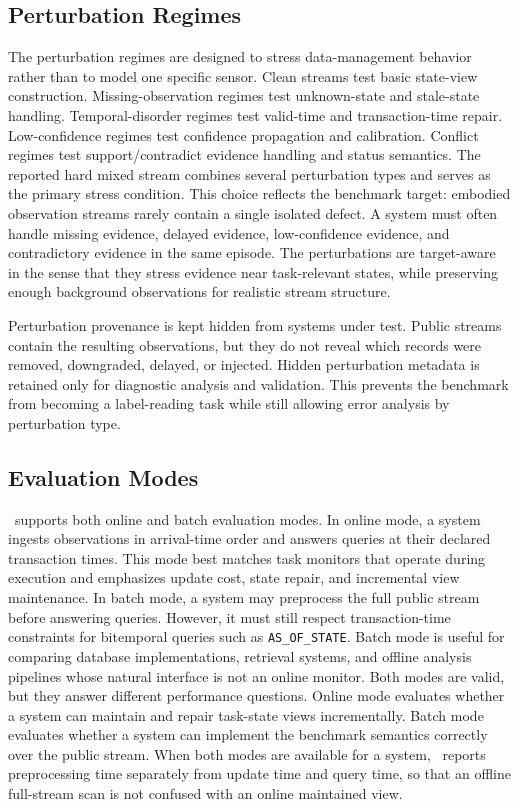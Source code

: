\subsection{Perturbation Regimes}

The perturbation regimes are designed to stress data-management behavior rather than to model one specific sensor. Clean streams test basic state-view construction. Missing-observation regimes test unknown-state and stale-state handling. Temporal-disorder regimes test valid-time and transaction-time repair. Low-confidence regimes test confidence propagation and calibration. Conflict regimes test support/contradict evidence handling and status semantics.
The reported hard mixed stream combines several perturbation types and serves as the primary stress condition. This choice reflects the benchmark target: embodied observation streams rarely contain a single isolated defect. A system must often handle missing evidence, delayed evidence, low-confidence evidence, and contradictory evidence in the same episode. The perturbations are target-aware in the sense that they stress evidence near task-relevant states, while preserving enough background observations for realistic stream structure.

Perturbation provenance is kept hidden from systems under test. Public streams contain the resulting observations, but they do not reveal which records were removed, downgraded, delayed, or injected. Hidden perturbation metadata is retained only for diagnostic analysis and validation. This prevents the benchmark from becoming a label-reading task while still allowing error analysis by perturbation type.

\subsection{Evaluation Modes}

\bench\ supports both online and batch evaluation modes. In online mode, a system ingests observations in arrival-time order and answers queries at their declared transaction times. This mode best matches task monitors that operate during execution and emphasizes update cost, state repair, and incremental view maintenance.
In batch mode, a system may preprocess the full public stream before answering queries. However, it must still respect transaction-time constraints for bitemporal queries such as \texttt{AS\_OF\_STATE}. Batch mode is useful for comparing database implementations, retrieval systems, and offline analysis pipelines whose natural interface is not an online monitor.
Both modes are valid, but they answer different performance questions. Online mode evaluates whether a system can maintain and repair task-state views incrementally. Batch mode evaluates whether a system can implement the benchmark semantics correctly over the public stream. When both modes are available for a system, \bench\ reports preprocessing time separately from update time and query time, so that an offline full-stream scan is not confused with an online maintained view.


